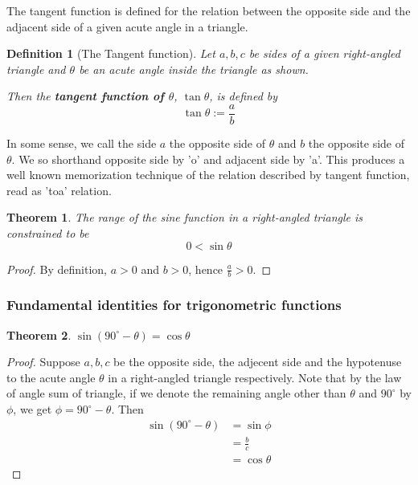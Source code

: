 \documentclass[12pt]{article}
\newtheorem{definition}{Definition}[section]
\newtheorem*{theorem}{Theorem}
\begin{document}
    The tangent function is defined for the relation between the opposite side and the adjacent side of a given acute angle in a triangle.

    \begin{definition}[The Tangent function]
        Let $a,b,c$ be sides of a given right-angled triangle and $\theta$ be an acute angle inside the triangle as shown.

        Then the \textbf{tangent function of $\theta$}, $\tan{\theta}$, is defined by $$\tan{\theta}:=\frac{a}{b}$$
    \end{definition}

    In some sense, we call the side $a$ the opposite side of $\theta$ and $b$ the opposite side of $\theta$. We so shorthand opposite side by 'o' and adjacent side by 'a'. This produces a well known memorization technique of the relation described by tangent function, read as 'toa' relation.

    \begin{theorem}
        The range of the sine function in a right-angled triangle is constrained to be $$0<\sin{\theta}$$
    \end{theorem}

    \begin{proof}
        By definition, $a>0$ and $b>0$, hence $\frac{a}{b}>0$.
    \end{proof}

    \subsubsection*{Fundamental identities for trigonometric functions}

    \begin{theorem}
        $\sin(90^\circ - \theta)=\cos{\theta}$
    \end{theorem}

    \begin{proof}
        Suppose $a,b,c$ be the opposite side, the adjecent side and the hypotenuse to the acute angle $\theta$ in a right-angled triangle respectively. Note that by the law of angle sum of triangle, if we denote the remaining angle other than $\theta$ and $90^\circ$ by $\phi$, we get $\phi = 90^\circ - \theta$. Then \begin{align*}
            \sin(90^\circ - \theta) &= \sin{\phi}\\
            &= \frac{b}{c}\\
            &= \cos{\theta}
        \end{align*}
    \end{proof}
\end{document}
